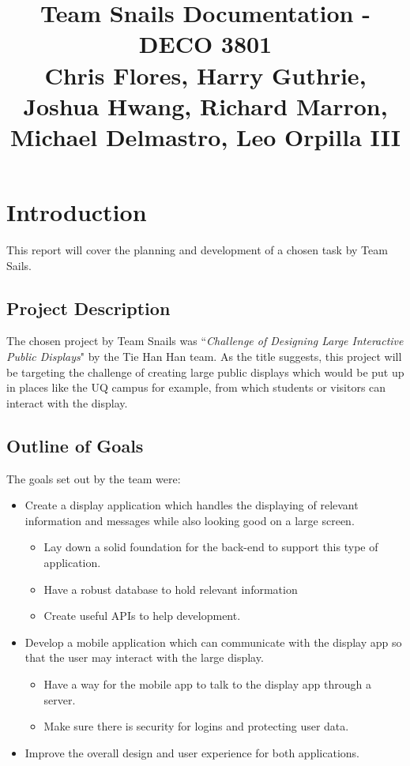 \documentclass{article}
\begin{document}
 
\title{Team Snails Documentation - DECO 3801\\
Chris Flores, Harry Guthrie, Joshua Hwang, Richard Marron, Michael Delmastro, Leo Orpilla III} 
\maketitle 

\tableofcontents

\newpage

\section{Introduction}
	
	This report will cover the planning and development of a chosen task by Team Sails. 
	
	\subsection{Project Description}
		The chosen project by Team Snails was ``{\it Challenge of Designing Large Interactive Public Displays}" by the Tie Han Han team. As the title suggests, this project will be targeting the challenge of creating large public displays which would be put up in places like the UQ campus for example, from which students or visitors can interact with the display. 

	\subsection{Outline of Goals}
		The goals set out by the team were:
		\begin{itemize}
			\item Create a display application which handles the displaying of relevant information and messages while also looking good on a large screen.
				\begin{itemize}
					\item Lay down a solid foundation for the back-end to support this type of application.
					\item Have a robust database to hold relevant information
					\item Create useful APIs to help development.
				\end{itemize}
			\item Develop a mobile application which can communicate with the display app so that the user may interact with the large display.
				\begin{itemize}
					\item Have a way for the mobile app to talk to the display app through a server.
					\item Make sure there is security for logins and protecting user data.
				\end{itemize}
			\item Improve the overall design and user experience for both applications.
		\end{itemize}
\end{document}
